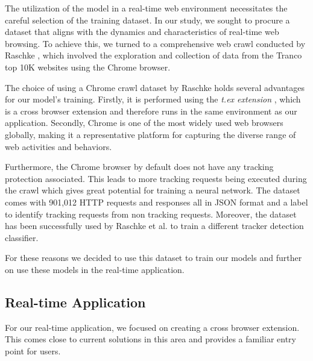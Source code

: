 The utilization of the model in a real-time web environment necessitates the careful selection of the training dataset.
In our study, we sought to procure a dataset that aligns with the dynamics and characteristics of real-time web browsing.
To achieve this, we turned to a comprehensive web crawl conducted by Raschke \cite{raschke_philip_2022_7123945}, which involved the exploration and collection
of data from the Tranco \cite{pochat2018tranco} top 10K websites using the Chrome browser.

The choice of using a Chrome crawl dataset by Raschke holds several advantages for our model's training. Firstly, it is performed 
using the \emph{t.ex extension} \cite{9972261}, which is a cross browser extension and therefore runs in the same environment as our
application. Secondly, Chrome is one of the most widely used web browsers globally, making it a representative platform for
capturing the diverse range of web activities and behaviors.

Furthermore, the Chrome browser by default does not have any tracking protection associated. This leads to more tracking requests being executed
during the crawl which gives great potential for training a neural network. The dataset comes with 901,012 HTTP requests and responses all in JSON
format and a label to identify tracking requests from non tracking requests. Moreover, the dataset has been successfully used by Raschke et al. \cite{raschke2023}
to train a different tracker detection classifier.

For these reasons we decided to use this dataset \cite{raschke_philip_2022_7123945} to train our models and further on use these models
in the real-time application.

\subsection{Real-time Application}

For our real-time application, we focused on creating a cross browser extension. This comes close to current solutions in this area 
and provides a familiar entry point for users. 

